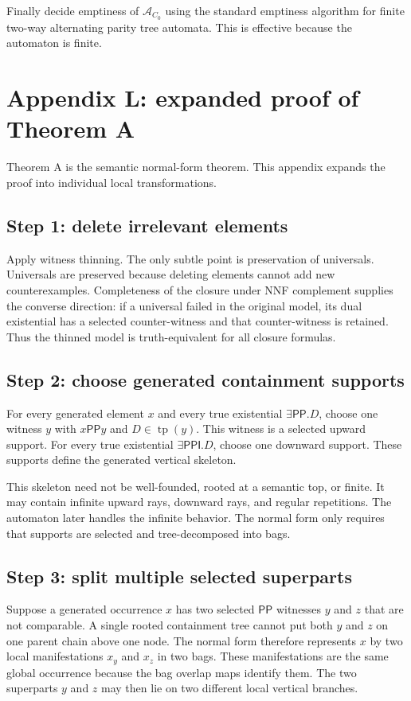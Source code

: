 \documentclass[11pt]{article}
\newcommand{\PP}{\mathsf{PP}}
\newcommand{\PPI}{\mathsf{PPI}}
\newcommand{\tp}{\operatorname{tp}}
\newcommand{\APTA}{\mathcal A}
\begin{document}
Finally decide emptiness of $\APTA_{C_0}$ using the standard emptiness algorithm for finite two-way alternating parity tree automata.  This is effective because the automaton is finite.

\section{Appendix L: expanded proof of Theorem A}

Theorem A is the semantic normal-form theorem.  This appendix expands the proof into individual local transformations.

\subsection{Step 1: delete irrelevant elements}

Apply witness thinning.  The only subtle point is preservation of universals.  Universals are preserved because deleting elements cannot add new counterexamples.  Completeness of the closure under NNF complement supplies the converse direction: if a universal failed in the original model, its dual existential has a selected counter-witness and that counter-witness is retained.  Thus the thinned model is truth-equivalent for all closure formulas.

\subsection{Step 2: choose generated containment supports}

For every generated element $x$ and every true existential $\exists\PP.D$, choose one witness $y$ with $x\PP y$ and $D\in\tp(y)$.  This witness is a selected upward support.  For every true existential $\exists\PPI.D$, choose one downward support.  These supports define the generated vertical skeleton.

This skeleton need not be well-founded, rooted at a semantic top, or finite.  It may contain infinite upward rays, downward rays, and regular repetitions.  The automaton later handles the infinite behavior.  The normal form only requires that supports are selected and tree-decomposed into bags.

\subsection{Step 3: split multiple selected superparts}

Suppose a generated occurrence $x$ has two selected $\PP$ witnesses $y$ and $z$ that are not comparable.  A single rooted containment tree cannot put both $y$ and $z$ on one parent chain above one node.  The normal form therefore represents $x$ by two local manifestations $x_y$ and $x_z$ in two bags.  These manifestations are the same global occurrence because the bag overlap maps identify them.  The two superparts $y$ and $z$ may then lie on two different local vertical branches.
\end{document}
